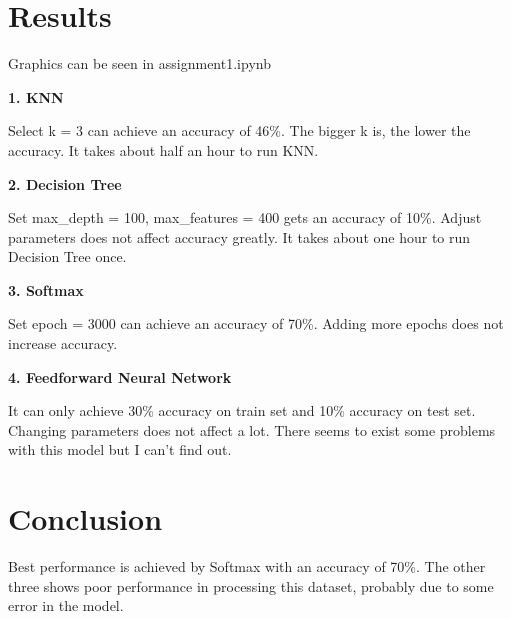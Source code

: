 \documentclass{article}
\begin{document}
\section{Results}

Graphics can be seen in assignment1.ipynb

\textbf{1. KNN}

Select k = 3 can achieve an accuracy of 46\%. The bigger k is, the lower the accuracy. It takes about half an hour to run KNN.

\textbf{2. Decision Tree}

Set max\_depth = 100, max\_features = 400 gets an accuracy of 10\%. Adjust parameters does not affect accuracy greatly. It takes about one hour to run Decision Tree once.

\textbf{3. Softmax}

Set epoch = 3000 can achieve an accuracy of 70\%. Adding more epochs does not increase accuracy.

\textbf{4. Feedforward Neural Network}

It can only achieve 30\%  accuracy on train set and 10\% accuracy on test set. Changing parameters does not affect a lot. There seems to exist some problems with this model but I can't find out.


\section{Conclusion}
Best performance is achieved by Softmax with an accuracy of 70\%.  The other three shows poor performance in processing this dataset, probably due to some error in the model.





\end{document}
